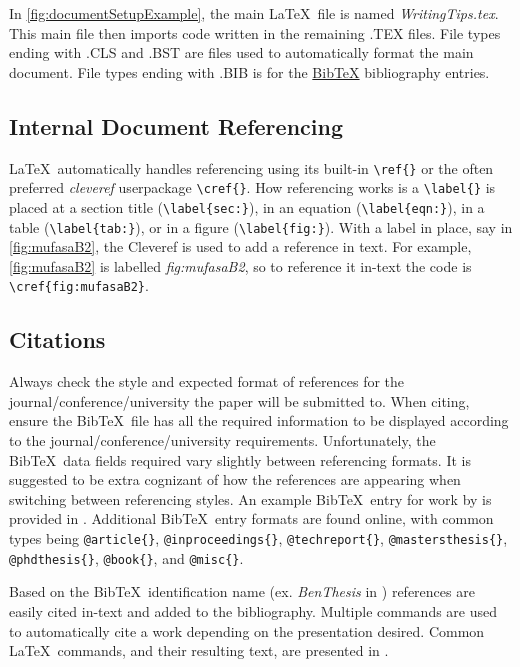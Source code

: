 \noindent
In \cref{fig:documentSetupExample}, the main \LaTeX\ file is named \textit{WritingTips.tex}. 
This main file then imports code written in the remaining .TEX files. 
File types ending with .CLS and .BST are files used to automatically format the main document. 
File types ending with .BIB is for the \href{https://www.bibtex.org/}{Bib\TeX} bibliography entries. 



\subsection{Internal Document Referencing}

\LaTeX\ automatically handles referencing using its built-in \verb*|\ref{}| or the often preferred \textit{cleveref} userpackage \verb*|\cref{}|. 
How referencing works is a \verb*|\label{}| is placed at a section title (\verb*|\label{sec:}|), in an equation (\verb*|\label{eqn:}|), in a table (\verb*|\label{tab:}|), or in a figure (\verb*|\label{fig:}|). 
With a label in place, say in \cref{fig:mufasaB2}, the Cleveref is used to add a reference in text. For example, \cref{fig:mufasaB2} is labelled \textit{fig:mufasaB2}, so to reference it in-text the code is \verb*|\cref{fig:mufasaB2}|.

\subsection{Citations} \label{sec:citations}

Always check the style and expected format of references for the journal/conference/university the paper will be submitted to. 
When citing, ensure the Bib\TeX\ file has all the required information to be displayed according to the journal/conference/university requirements. 
Unfortunately, the Bib\TeX\ data fields required vary slightly between referencing formats. It is suggested to be extra cognizant  of how the references are appearing when switching between referencing styles.  
An example Bib\TeX\ entry for work by \citeauthor{BenThesis} \cite{BenThesis} is provided in . 
Additional Bib\TeX\ entry formats are found online, with common types being \verb*|@article{}|, \verb*|@inproceedings{}|, \verb*|@techreport{}|, \verb*|@mastersthesis{}|, \verb*|@phdthesis{}|, \verb*|@book{}|, and \verb*|@misc{}|. 
 
Based on the Bib\TeX\ identification name (ex. \textit{BenThesis} in ) references are easily cited in-text and added to the bibliography. 
Multiple commands are used to automatically cite a work depending on the presentation desired. 
Common \LaTeX\ commands, and their resulting text, are presented in .

